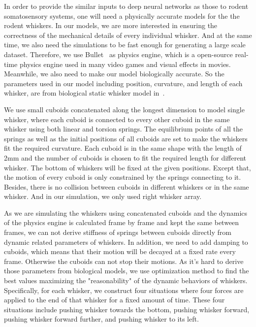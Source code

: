 In order to provide the similar inputs to deep neural networks as those to rodent somatosensory systems, one will need a physically accurate models for the the rodent whiskers.
In our models, we are more interested in ensuring the correctness of the mechanical details of every individual whisker.
And at the same time, we also need the simulations to be fast enough for generating a large scale dataset.
Therefore, we use Bullet~\cite{wiki:bullet} as physics engine, which is a open-source real-time physics engine used in many video games and visual effects in movies.
Meanwhile, we also need to make our model biologically accurate. So the parameters used in our model including position, curvature, and length of each whisker, are from biological static whisker model in~\cite{Towal2011}.

We use small cuboids concatenated along the longest dimension to model single whisker, where each cuboid is connected to every other cuboid in the same whisker using both linear and torsion springs.
The equilibrium points of all the springs as well as the initial positions of all cuboids are set to make the whiskers fit the required curvature.
Each cuboid is in the same shape with the length of 2mm and the number of cuboids is chosen to fit the required length for different whisker.
The bottom of whiskers will be fixed at the given positions. Except that, the motion of every cuboid is only constrained by the springs connecting to it.
Besides, there is no collision between cuboids in different whiskers or in the same whisker.
And in our simulation, we only used right whisker array.

As we are simulating the whiskers using concatenated cuboids and the dynamics of the physics engine is calculated frame by frame and kept the same between frames, we can not derive stiffness of springs between cuboids directly from dynamic related parameters of whiskers.
In addition, we need to add damping to cuboids, which means that their motion will be decayed at a fixed rate every frame. Otherwise the cuboids can not stop their motions.
As it's hard to derive those parameters from biological models, we use optimization method to find the best values maximizing the "reasonability" of the dynamic behaviors of whiskers.
Specifically, for each whisker, we construct four situations where four forces are applied to the end of that whisker for a fixed amount of time.
These four situations include pushing whisker towards the bottom, pushing whisker forward, pushing whisker forward further, and pushing whisker to its left.

